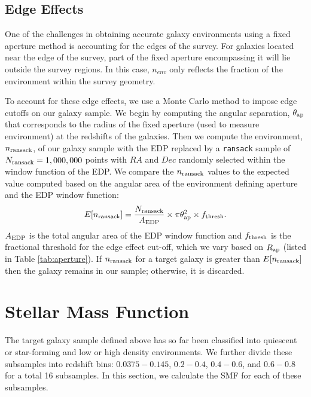 \documentclass{emulateapj}
\begin{document}
\subsection{Edge Effects} \label{sec:edgeeffect}
One of the challenges in obtaining accurate galaxy environments using a fixed aperture method is accounting for the edges of the survey. For galaxies located near the edge of the survey, part of the fixed aperture encompassing it will lie outside the survey regions. In this case, $n_{env}$ only reflects the fraction of the environment within the survey geometry.

To account for these edge effects, we use a Monte Carlo method to impose edge cutoffs on our galaxy sample. We begin by computing the angular separation, $\theta_{\rm{ap}}$ that corresponds to the radius of the fixed aperture (used to measure environment) at the redshifts of the galaxies. Then we compute the environment, $n_{\rm{ransack}}$, of our galaxy sample with the EDP replaced by a \texttt{ransack} sample of $N_{\rm{ransack}} = 1,000,000$ points with $RA$ and $Dec$ randomly selected within the window function of the EDP. We compare the $n_{\rm{ransack}}$ values to the expected value computed based on the angular area of the environment defining aperture and the EDP window function: 
\begin{equation} \label{eq:ransack}
E[n_{\rm{ransack}}] = \frac{N_{\rm{ransack}}}{A_{\rm{EDP}}}\times {\pi \theta_{\rm{ap}}^2} \times f_{\rm{thresh}}. 
\end{equation} 
$A_{\rm{EDP}}$ is the total angular area of the EDP window function and $f_{\rm{thresh}}$ is the fractional threshold for the edge effect cut-off, which we vary based on $R_{\rm{ap}}$ (listed in Table \ref{tab:aperture}). If $n_{\rm{ransack}}$ for a target galaxy is greater than $E[n_{\rm{ransack}}]$ then the galaxy remains in our sample; otherwise, it is discarded. 

\section{Stellar Mass Function} \label{sec:smf}
The target galaxy sample defined above has so far been classified into quiescent or star-forming and low or high density environments. We further divide these subsamples into redshift bins: $0.0375-0.145$, $0.2-0.4$, $0.4-0.6$, and $0.6-0.8$ for a total 16 subsamples. In this section, we calculate the SMF for each of these subsamples. 
\end{document}
